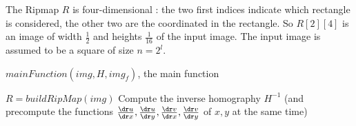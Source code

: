 

\label{pseudo_code_Ripmap}



The Ripmap $R$ is four-dimensional  : the two first indices indicate which rectangle is considered, the other two are the coordinated in the rectangle. So $R[2][4]$ is an image of width $\frac{1}{2}$ and heights $\frac{1}{16}$ of the input image. The input image is assumed to be a square of size $n=2^l$.





\medbreak
\medbreak
\begin{algorithm}[H]
\caption{$mainFunction(img,H,img_f)$, the main function}
$R = buildRipMap(img)$
Compute the inverse homography $H^{-1}$ (and precompute the functions $\frac{\dr u}{\dr x},\frac{\dr u}{\dr y},\frac{\dr v}{\dr x},\frac{\dr v}{\dr y}$ of $x,y$ at the same time)\;
\end{algorithm}

\medbreak
\medbreak
\medbreak
\medbreak

